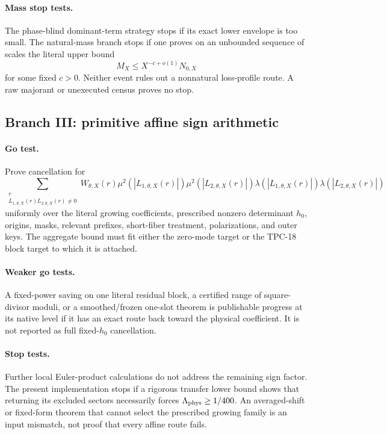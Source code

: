 \paragraph{Mass stop tests.}
The phase-blind dominant-term strategy stops if its exact lower
envelope is too small.  The natural-mass branch stops if one proves on
an unbounded sequence of scales the literal upper bound
\[
 M_X\le X^{-c+o(1)}N_{0,X}
\]
for some fixed \(c>0\).  Neither event rules out a nonnatural
loss-profile route.  A raw majorant or unexecuted census proves no
stop.

\subsection{Branch III: primitive affine sign arithmetic}

\paragraph{Go test.}
Prove cancellation for
\[
 \sum_{\substack{r\\
 L_{1,\theta,X}(r)L_{2,\theta,X}(r)\ne0}}
 W_{\theta,X}(r)
 \mu^2(|L_{1,\theta,X}(r)|)
 \mu^2(|L_{2,\theta,X}(r)|)
 \lambda(|L_{1,\theta,X}(r)|)
 \lambda(|L_{2,\theta,X}(r)|)
\]
uniformly over the literal growing coefficients, prescribed
nonzero determinant \(h_0\), origins, masks, relevant prefixes,
short-fiber treatment, polarizations, and outer keys.  The aggregate
bound must fit either the zero-mode target or the TPC-18 block target
to which it is attached.

\paragraph{Weaker go tests.}
A fixed-power saving on one literal residual block, a certified range
of square-divisor moduli, or a smoothed/frozen one-slot theorem is
publishable progress at its native level if it has an exact route back
toward the physical coefficient.  It is not reported as full
fixed-\(h_0\) cancellation.

\paragraph{Stop tests.}
Further local Euler-product calculations do not address the remaining
sign factor.  The present implementation stops if a rigorous transfer
lower bound shows that returning its excluded sectors necessarily
forces \(\Lambda_{\rm phys}\ge1/400\).  An averaged-shift or fixed-form
theorem that cannot select the prescribed growing family is an input
mismatch, not proof that every affine route fails.

